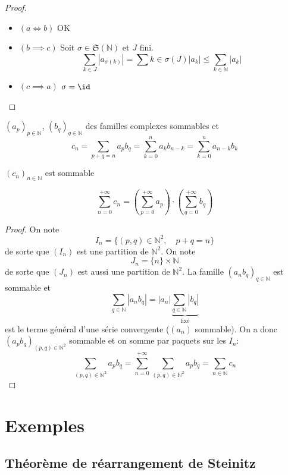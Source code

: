 \begin{proof}~
    \begin{itemize}
        \item $(a\iff b)$ OK
        \item $(b\implies c)$ Soit $\sigma\in\mathfrak S(\mathbb N)$ et $J$ fini. \[
                \sum_{k\in J}|a_{\sigma(k)}|=\sum{k\in\sigma(J)}|a_k|\leq \sum_{k\in\mathbb N}|a_k|
            \]
        \item $(c\implies a)$ $\sigma=\id$
    \end{itemize}
\end{proof}

\begin{thm}
    \Hyp $(a_p)_{p\in\mathbb N}$, $(b_q)_{q\in\mathbb N}$ des familles complexes sommables et \[
        c_n=\sum_{p+q=n}a_pb_q=\sum_{k=0}^na_kb_{n-k}=\sum_{k=0}^na_{n-k}b_k
    \]
    \begin{concenum}
    \item $(c_n)_{n\in\mathbb N}$ est sommable
    \item \[
            \sum_{n=0}^{+\infty}c_n= \left( \sum_{p=0}^{+\infty} a_p \right)\cdot \left( \sum_{q=0}^{+\infty}b_q \right)
        \]
    \end{concenum}
\end{thm}

\begin{proof}
    On note \[
        I_n=\{(p, q)\in\mathbb N^2, \quad p+q=n\}
    \]
    de sorte que $(I_n)$ est une partition de $\mathbb N^2$. On note \[
        J_n=\{n\}\times \mathbb N
    \]
    de sorte que $(J_n)$ est aussi une partition de $\mathbb N^2$. La famille $(a_nb_q)_{q\in\mathbb N}$ est sommable et \[
        \sum_{q\in\mathbb N}|a_nb_q|=|a_n|\underbrace{\sum_{q\in\mathbb N}|b_q|}_{\text{fixé}}
    \]
    est le terme général d'une série convergente ($(a_n)$ sommable).
    On a donc $(a_pb_q)_{(p, q)\in\mathbb N^2}$ sommable et on somme par paquets sur les $I_n$:\[
        \sum_{(p, q)\in\mathbb N^2}a_pb_q=\sum_{n=0}^{+\infty}\sum_{(p, q)\in\mathbb N^2}a_pb_q=\sum_{n\in\mathbb N}c_n
    \]
\end{proof}

\section{Exemples}

\subsection{Théorème de réarrangement de Steinitz}

